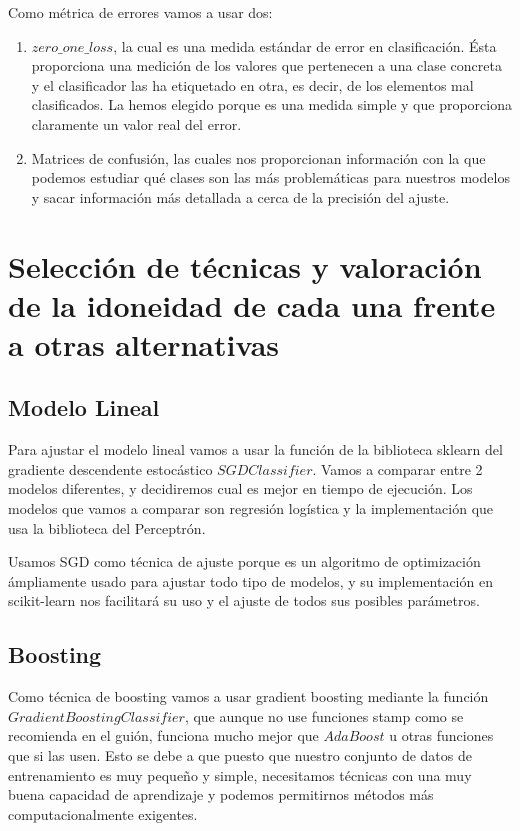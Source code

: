 \documentclass{article}
\begin{document}
	Como métrica de errores vamos a usar dos:
	\begin{enumerate}
		\item $zero\_one\_loss$, la cual es una medida estándar de error en clasificación. Ésta proporciona una medición de los valores que pertenecen a una clase concreta y el clasificador las ha etiquetado en otra, es decir, de los elementos mal clasificados. La hemos elegido porque es una medida simple y que proporciona claramente un valor real del error.
		\item Matrices de confusión, las cuales nos proporcionan información con la que podemos estudiar qué clases son las más problemáticas para nuestros modelos y sacar información más detallada a cerca de la precisión del ajuste.
	\end{enumerate}
	
	\section{Selección de técnicas y valoración de la idoneidad de cada una frente a otras alternativas}
	
	\subsection{Modelo Lineal}
	Para ajustar el modelo lineal vamos a usar la función de la biblioteca sklearn del gradiente descendente estocástico $SGDClassifier$. Vamos a comparar entre 2 modelos diferentes, y decidiremos cual es mejor en tiempo de ejecución. Los modelos que vamos a comparar son regresión logística y la implementación que usa la biblioteca del Perceptrón.
	\par 
	Usamos SGD como técnica	de ajuste porque es un algoritmo de optimización ámpliamente usado para ajustar todo tipo de modelos, y su implementación en scikit-learn nos facilitará su uso y el ajuste de todos sus posibles parámetros. 
	\subsection{Boosting}
	Como técnica de boosting vamos a usar gradient boosting mediante la función $GradientBoostingClassifier$, que aunque no use funciones stamp como se recomienda en el guión, funciona mucho mejor que $AdaBoost$ u otras funciones que si las usen. Esto se debe a que puesto que nuestro conjunto de datos de entrenamiento es muy pequeño y simple, necesitamos técnicas con una muy buena capacidad de aprendizaje y podemos permitirnos métodos más computacionalmente exigentes. 
\end{document}

